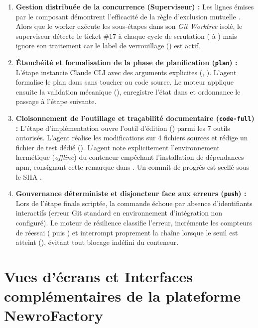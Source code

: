 \documentclass{tnreport}
\begin{document}
\begin{enumerate}
    \item \textbf{Gestion distribuée de la concurrence (Superviseur) :}
    Les lignes émises par le composant  démontrent l'efficacité de la règle d'exclusion mutuelle . Alors que le worker exécute les sous-étapes dans son \textit{Git Worktree} isolé, le superviseur détecte le ticket \#17 à chaque cycle de scrutation ( à ) mais ignore son traitement car le label de verrouillage () est actif.

    \item \textbf{Étanchéité et formalisation de la phase de planification (\texttt{plan}) :}
    L'étape  instancie Claude CLI avec des arguments explicites (, ). L'agent formalise le plan dans  sans toucher au code source. Le moteur applique ensuite la validation mécanique (), enregistre l'état dans  et ordonnance le passage à l'étape suivante.

    \item \textbf{Cloisonnement de l'outillage et traçabilité documentaire (\texttt{code-full}) :}
    L'étape d'implémentation ouvre l'outil d'édition () parmi les 7 outils autorisés. L'agent réalise les modifications sur 4 fichiers sources et rédige un fichier de test dédié (). L'agent note explicitement l'environnement hermétique (\textit{offline}) du conteneur empêchant l'installation de dépendances npm, consignant cette remarque dans . Un commit de progrès est scellé sous le SHA .

    \item \textbf{Gouvernance déterministe et disjoncteur face aux erreurs (\texttt{push}) :}
    Lors de l'étape finale scriptée, la commande  échoue par absence d'identifiants interactifs (erreur Git standard en environnement d'intégration non configuré). Le moteur de résilience classifie l'erreur, incrémente les compteurs de réessai ( puis ) et interrompt proprement la chaîne lorsque le seuil est atteint (), évitant tout blocage indéfini du conteneur.
\end{enumerate}

\cleardoublepage

\chapter{Vues d'écrans et Interfaces complémentaires de la plateforme NewroFactory}
\label{annexe:interfaces_quiz}
\end{document}
